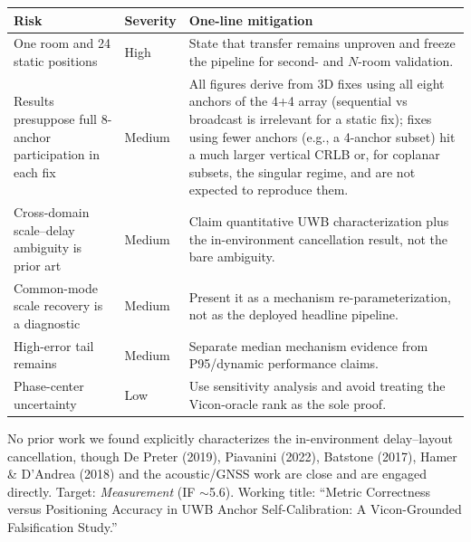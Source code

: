\documentclass[10pt,a4paper]{article}
\makeatletter
\renewcommand\section{\@startsection{section}{1}{0pt}{0.65ex plus .2ex}{0.35ex}{\normalfont\normalsize\bfseries}}
\makeatother
\begin{document}
\section{Limitations}

\begin{center}
\scriptsize
\begin{tabularx}{\textwidth}{@{}>{\raggedright\arraybackslash}p{34mm}>{\raggedright\arraybackslash}p{19mm}>{\raggedright\arraybackslash}X@{}}
\toprule
Risk & Severity & One-line mitigation \\
\midrule
One room and 24 static positions & High & State that transfer remains unproven and freeze the pipeline for second- and $N$-room validation. \\
Results presuppose full 8-anchor participation in each fix & Medium & All figures derive from 3D fixes using all eight anchors of the 4+4 array (sequential vs broadcast is irrelevant for a static fix); fixes using fewer anchors (e.g., a 4-anchor subset) hit a much larger vertical CRLB or, for coplanar subsets, the singular regime, and are not expected to reproduce them. \\
Cross-domain scale--delay ambiguity is prior art & Medium & Claim quantitative UWB characterization plus the in-environment cancellation result, not the bare ambiguity. \\
Common-mode scale recovery is a diagnostic & Medium & Present it as a mechanism re-parameterization, not as the deployed headline pipeline. \\
High-error tail remains & Medium & Separate median mechanism evidence from P95/dynamic performance claims. \\
Phase-center uncertainty & Low & Use sensitivity analysis and avoid treating the Vicon-oracle rank as the sole proof. \\
\bottomrule
\end{tabularx}
\end{center}

No prior work we found explicitly characterizes the in-environment delay--layout cancellation, though De Preter (2019), Piavanini (2022), Batstone (2017), Hamer \& D'Andrea (2018) and the acoustic/GNSS work are close and are engaged directly. Target: \emph{Measurement} (IF $\sim$5.6). Working title: ``Metric Correctness versus Positioning Accuracy in UWB Anchor Self-Calibration: A Vicon-Grounded Falsification Study.''
\end{document}

